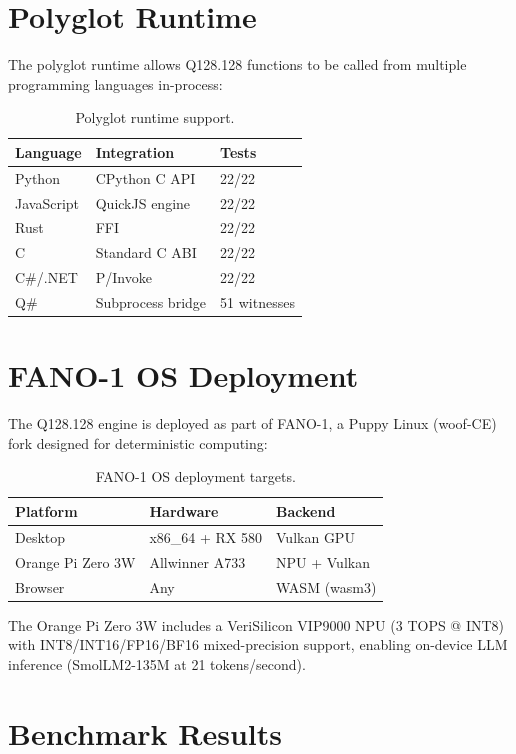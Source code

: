 \documentclass[11pt]{article}
\begin{document}
\section{Polyglot Runtime}

The polyglot runtime allows Q128.128 functions to be called from multiple programming languages in-process:

\begin{table}[ht]
\centering
\caption{Polyglot runtime support.}
\label{tab:polyglot}
\begin{tabular}{lll}
\toprule
Language & Integration & Tests \\
\midrule
Python & CPython C API & 22/22 \\
JavaScript & QuickJS engine & 22/22 \\
Rust & FFI & 22/22 \\
C & Standard C ABI & 22/22 \\
C\#/.NET & P/Invoke & 22/22 \\
Q\# & Subprocess bridge & 51 witnesses \\
\bottomrule
\end{tabular}
\end{table}

\section{FANO-1 OS Deployment}

The Q128.128 engine is deployed as part of FANO-1, a Puppy Linux (woof-CE) fork designed for deterministic computing:

\begin{table}[ht]
\centering
\caption{FANO-1 OS deployment targets.}
\label{tab:fano1}
\begin{tabular}{lll}
\toprule
Platform & Hardware & Backend \\
\midrule
Desktop & x86\_64 + RX 580 & Vulkan GPU \\
Orange Pi Zero 3W & Allwinner A733 & NPU + Vulkan \\
Browser & Any & WASM (wasm3) \\
\bottomrule
\end{tabular}
\end{table}

The Orange Pi Zero 3W includes a VeriSilicon VIP9000 NPU (3 TOPS @ INT8) with INT8/INT16/FP16/BF16 mixed-precision support, enabling on-device LLM inference (SmolLM2-135M at 21 tokens/second).

\section{Benchmark Results}
\end{document}
